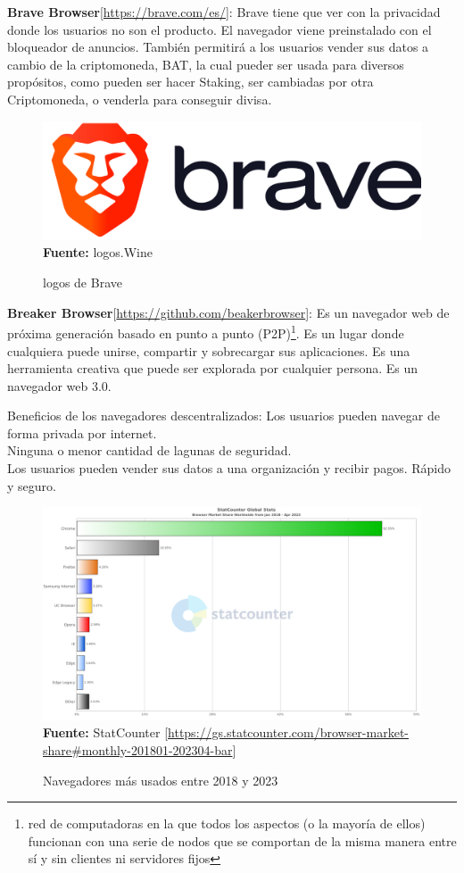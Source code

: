 \hfill \break
\textbf{Brave Browser}[\url{https://brave.com/es/}]:
Brave tiene que ver con la privacidad donde los usuarios no son el producto.
El navegador viene preinstalado con el bloqueador de anuncios. También permitirá
a los usuarios vender sus datos a cambio de la criptomoneda, BAT, la cual pueder
ser usada para diversos propósitos, como pueden ser hacer Staking, ser cambiadas por
otra Criptomoneda, o venderla para conseguir divisa.

\begin{figure}[htb!]
    \caption{logos de Brave}
    \label{fig:brave}
    \centering
    \includegraphics[scale=0.1]{./Ilustraciones/logos/brave-logo.png}\\
    \textbf{Fuente:} logos.Wine
\end{figure}

\textbf{Breaker Browser}[\url{https://github.com/beakerbrowser}]:
Es un navegador web de próxima generación basado en
punto a punto (P2P)\footnote{ red de computadoras en la que todos los aspectos
    (o la mayoría de ellos) funcionan con una serie de nodos que se comportan de
    la misma manera entre sí y sin clientes ni servidores fijos\cite{p2p}}.
Es un lugar donde cualquiera puede unirse, compartir y
sobrecargar sus aplicaciones. Es una herramienta creativa que puede ser
explorada por cualquier persona. Es un navegador web 3.0.

\hfill \break
Beneficios de los navegadores descentralizados: Los usuarios pueden navegar de
forma privada por internet.\\ Ninguna o menor cantidad de lagunas de seguridad.
\\ Los usuarios pueden vender sus datos a una organización y recibir pagos.
Rápido y seguro.
\begin{figure}[htb!]
    \caption{Navegadores más usados entre 2018 y 2023}
    \label{fig:browser}
    \centering
    \includegraphics[scale=0.5]{./Ilustraciones/StatCounter-browser-ww-monthly-201801-202304-bar.png}\\
    \textbf{Fuente:} StatCounter [\url{https://gs.statcounter.com/browser-market-share#monthly-201801-202304-bar}]
\end{figure}